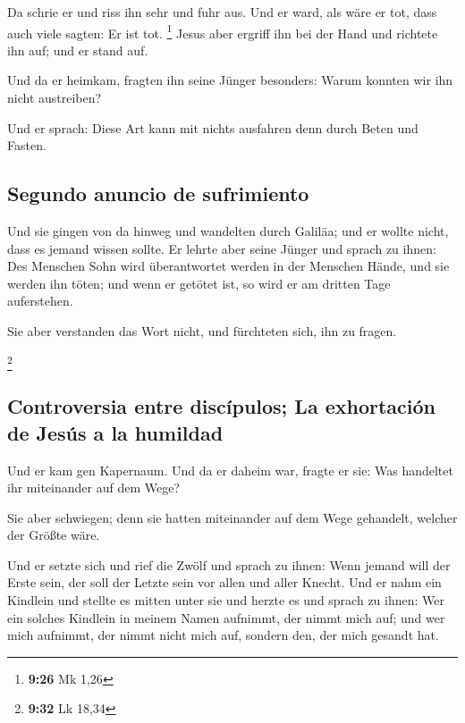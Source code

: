  Da schrie er und riss ihn sehr und fuhr aus. Und er
ward, als wäre er tot, dass auch viele sagten: Er ist tot. \footnote{\textbf{9:26}
  Mk 1,26}  Jesus aber ergriff ihn bei der Hand und
richtete ihn auf; und er stand auf.

 Und da er heimkam, fragten ihn seine Jünger besonders:
Warum konnten wir ihn nicht austreiben?

 Und er sprach: Diese Art kann mit nichts ausfahren denn
durch Beten und Fasten.

\hypertarget{segundo-anuncio-de-sufrimiento}{%
\subsection{Segundo anuncio de
sufrimiento}\label{segundo-anuncio-de-sufrimiento}}

 Und sie gingen von da hinweg und wandelten durch
Galiläa; und er wollte nicht, dass es jemand wissen sollte.
 Er lehrte aber seine Jünger und sprach zu ihnen: Des
Menschen Sohn wird überantwortet werden in der Menschen Hände, und sie
werden ihn töten; und wenn er getötet ist, so wird er am dritten Tage
auferstehen.

 Sie aber verstanden das Wort nicht, und fürchteten sich,
ihn zu fragen.

\footnote{\textbf{9:32} Lk 18,34}

\hypertarget{controversia-entre-discuxedpulos-la-exhortaciuxf3n-de-jesuxfas-a-la-humildad}{%
\subsection{Controversia entre discípulos; La exhortación de Jesús a la
humildad}\label{controversia-entre-discuxedpulos-la-exhortaciuxf3n-de-jesuxfas-a-la-humildad}}

 Und er kam gen Kapernaum. Und da er daheim war, fragte
er sie: Was handeltet ihr miteinander auf dem Wege?

 Sie aber schwiegen; denn sie hatten miteinander auf dem
Wege gehandelt, welcher der Größte wäre.

 Und er setzte sich und rief die Zwölf und sprach zu
ihnen: Wenn jemand will der Erste sein, der soll der Letzte sein vor
allen und aller Knecht.  Und er nahm ein Kindlein und
stellte es mitten unter sie und herzte es und sprach zu ihnen:
 Wer ein solches Kindlein in meinem Namen aufnimmt, der
nimmt mich auf; und wer mich aufnimmt, der nimmt nicht mich auf, sondern
den, der mich gesandt hat.

